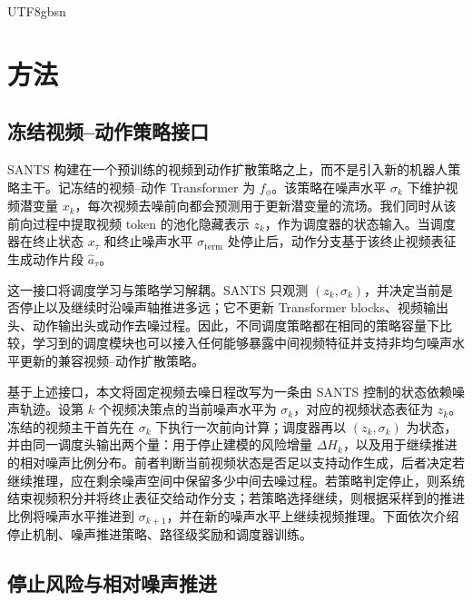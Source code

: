 \documentclass{article}
\begin{document}
\begin{CJK*}{UTF8}{gbsn}
\begin{itemize}
\end{itemize}

\section{方法}

\subsection{冻结视频--动作策略接口}
\label{sec:method-policy-interface}

SANTS 构建在一个预训练的视频到动作扩散策略之上，而不是引入新的机器人策略主干。记冻结的视频--动作 Transformer 为 \(f_{\phi}\)。该策略在噪声水平 \(\sigma_k\) 下维护视频潜变量 \(x_k\)，每次视频去噪前向都会预测用于更新潜变量的流场。我们同时从该前向过程中提取视频 token 的池化隐藏表示 \(z_k\)，作为调度器的状态输入。当调度器在终止状态 \(x_{\tau}\) 和终止噪声水平 \(\sigma_{\mathrm{term}}\) 处停止后，动作分支基于该终止视频表征生成动作片段 \(\hat{a}_{\tau}\)。

这一接口将调度学习与策略学习解耦。SANTS 只观测 \((z_k,\sigma_k)\)，并决定当前是否停止以及继续时沿噪声轴推进多远；它不更新 Transformer blocks、视频输出头、动作输出头或动作去噪过程。因此，不同调度策略都在相同的策略容量下比较，学习到的调度模块也可以接入任何能够暴露中间视频特征并支持非均匀噪声水平更新的兼容视频--动作扩散策略。

基于上述接口，本文将固定视频去噪日程改写为一条由 SANTS 控制的状态依赖噪声轨迹。设第 \(k\) 个视频决策点的当前噪声水平为 \(\sigma_k\)，对应的视频状态表征为 \(z_k\)。冻结的视频主干首先在 \(\sigma_k\) 下执行一次前向计算；调度器再以 \((z_k,\sigma_k)\) 为状态，并由同一调度头输出两个量：用于停止建模的风险增量 \(\Delta H_k\)，以及用于继续推进的相对噪声比例分布。前者判断当前视频状态是否足以支持动作生成，后者决定若继续推理，应在剩余噪声空间中保留多少中间去噪过程。若策略判定停止，则系统结束视频积分并将终止表征交给动作分支；若策略选择继续，则根据采样到的推进比例将噪声水平推进到 \(\sigma_{k+1}\)，并在新的噪声水平上继续视频推理。下面依次介绍停止机制、噪声推进策略、路径级奖励和调度器训练。

\subsection{停止风险与相对噪声推进}


\end{CJK*}
\end{document}
